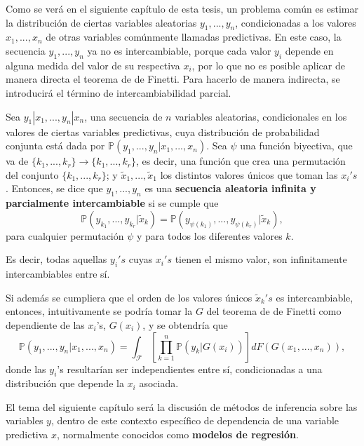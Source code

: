 Como se ver\'a en el siguiente cap\'itulo de esta tesis, un problema com\'un es estimar la distribuci\'on de ciertas variables aleatorias $y_1,...,y_n$, condicionadas a los valores $x_1,...,x_n$ de otras variables com\'unmente llamadas predictivas. En este caso, la secuencia $y_1,...,y_n$ ya no es intercambiable, porque cada valor $y_i$ depende en alguna medida del valor de su respectiva $x_i$, por lo que no es posible aplicar de manera directa el teorema de de Finetti. Para hacerlo de manera indirecta, se introducir\'a el t\'ermino de intercambiabilidad parcial.

\begin{defin*}
    Sea $y_1|x_1,...,y_n|x_n$, una secuencia de $n$ variables aleatorias, condicionales en los valores de ciertas variables predictivas, cuya distribuci\'on de probabilidad conjunta est\'a dada por $\mathbb{
    P}(y_1,...,y_n|x_1,...,x_n)$. Sea $\psi$ una funci\'on biyectiva, que va de $\{k_1,...,k_r\} \rightarrow \{k_1,...,k_r\}$, es decir, una funci\'on que crea una permutaci\'on del conjunto $\{k_1,...,k_r\}$; y $\tilde{x}_1,..., \tilde{x}_1$ los distintos valores \'unicos que toman las $x_i's$.  
    Entonces, se dice que $y_1,...,y_n$ es una \textbf{secuencia aleatoria infinita y parcialmente intercambiable} si se cumple que 
    \begin{equation*}
        \mathbb{P}(y_{k_1},...,y_{k_r}|\tilde{x}_k) = \mathbb{P}(y_{\psi(k_1)},...,y_{\psi(k_r)}|\tilde{x}_k),
    \end{equation*}
    para cualquier permutaci\'on $\psi$ y para todos los diferentes valores $k$.
    
    Es decir, todas aquellas $y_i's$ cuyas $x_i's$ tienen el mismo valor, son infinitamente intercambiables entre s\'i. 
\end{defin*}

Si adem\'as se cumpliera que el orden de los valores \'unicos $\tilde{x}_k's$ es intercambiable, entonces, intuitivamente se podr\'ia tomar la $G$ del teorema de de Finetti como dependiente de las $x_i$'s, $G(x_i)$, y se obtendr\'ia que
\begin{equation*}
    \mathbb{P}(y_1, ...,y_n|x_1,...,x_n) =
    \int_{\mathcal{F}}\left[\prod_{k=1}^n \mathbb{P}(y_k|G(x_i))\right]dF(G(x_1,...,x_n)),
\end{equation*}
donde las $y_i$'s resultar\'ian ser independientes entre s\'i, condicionadas a una distribuci\'on que depende la $x_i$ asociada.

El tema del siguiente cap\'itulo ser\'a la discusi\'on de m\'etodos de inferencia sobre las variables $y$, dentro de este contexto espec\'ifico de dependencia de una variable predictiva $x$, normalmente conocidos como \textbf{modelos de regresi\'on}.

\newpage